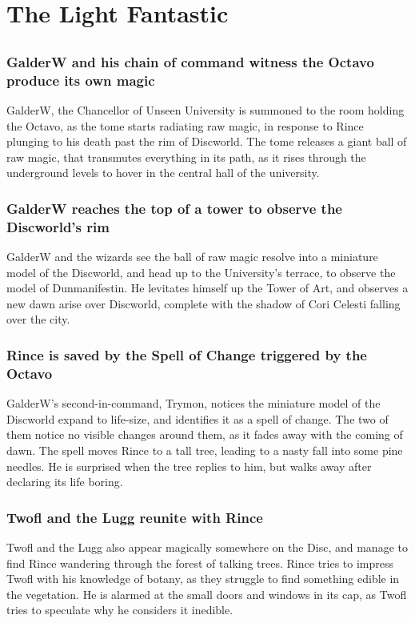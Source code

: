 \section{The Light Fantastic}


\subsection{}
\subsubsection{\Gls{GalderW} and his chain of command witness the Octavo produce its own magic}
\Gls{GalderW}, the Chancellor of Unseen University is summoned to the room holding the Octavo, as
the tome starts radiating raw magic, in response to \Gls{Rince} plunging to his death past the rim
of Discworld. The tome releases a giant ball of raw magic, that transmutes everything in its path,
as it rises through the underground levels to hover in the central hall of the university.

\subsubsection{\Gls{GalderW} reaches the top of a tower to observe the Discworld's rim}
\Gls{GalderW} and the wizards see the ball of raw magic resolve into a miniature model of the
Discworld, and head up to the University's terrace, to observe the model of Dunmanifestin. He
levitates himself up the Tower of Art, and observes a new dawn arise over Discworld, complete
with the shadow of Cori Celesti falling over the city.

\subsubsection{\Gls{Rince} is saved by the Spell of Change triggered by the Octavo}
\Gls{GalderW}'s second-in-command, \Gls{Trymon}, notices the miniature model of the Discworld expand
to life-size, and identifies it as a spell of change. The two of them notice no visible changes
around them, as it fades away with the coming of dawn. The spell moves \Gls{Rince} to a tall tree,
leading to a nasty fall into some pine needles. He is surprised when the tree replies to him, but
walks away after declaring its life boring.

\subsubsection{\Gls{Twofl} and the \Gls{Lugg} reunite with \Gls{Rince}}
\Gls{Twofl} and the \Gls{Lugg} also appear magically somewhere on the Disc, and manage to find
\Gls{Rince} wandering through the forest of talking trees. \Gls{Rince} tries to impress \Gls{Twofl}
with his knowledge of botany, as they struggle to find something edible in the vegetation. He is
alarmed at the small doors and windows in its cap, as \Gls{Twofl} tries to speculate why he
considers it inedible.


